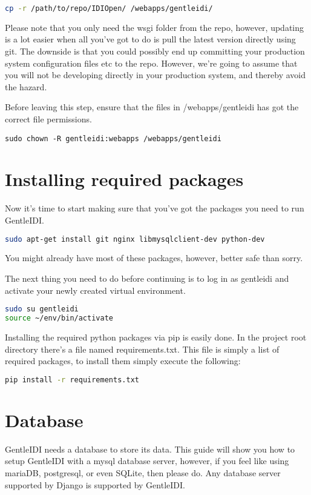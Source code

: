 \begin{lstlisting}[language=bash]
cp -r /path/to/repo/IDIOpen/ /webapps/gentleidi/
\end{lstlisting}

Please note that you only need the wsgi folder from the repo, however,
updating is a lot easier when all you've got to do is
pull the latest version directly using git. The downside is that you
could possibly end up committing your production system configuration
files etc to the repo. However, we're going to assume
that you will not be developing directly in your production system, and
thereby avoid the hazard.

Before leaving this step, ensure that the files in /webapps/gentleidi
has got the correct file permissions.

\begin{lstlisting}
sudo chown -R gentleidi:webapps /webapps/gentleidi
\end{lstlisting}

\section{Installing required packages}
Now it's time to start making sure that
you've got the packages you need to run GentleIDI.

\begin{lstlisting}[language=bash]
sudo apt-get install git nginx libmysqlclient-dev python-dev
\end{lstlisting}

You might already have most of these packages, however, better safe than
sorry.

The next thing you need to do before continuing is to log in as
gentleidi and activate your newly created virtual environment.

\begin{lstlisting}[language=bash]
sudo su gentleidi
source ~/env/bin/activate
\end{lstlisting}

Installing the required python packages via pip is easily done. In the
project root directory there's a file named
requirements.txt. This file is simply a list of required packages, to
install them simply execute the following:

\begin{lstlisting}[language=bash]
pip install -r requirements.txt
\end{lstlisting}

\section{Database}
GentleIDI needs a database to store its data. This guide will show you
how to setup GentleIDI with a mysql database server, however, if you
feel like using mariaDB, postgresql, or even SQLite, then please do.
Any database server supported by Django is supported by GentleIDI.

